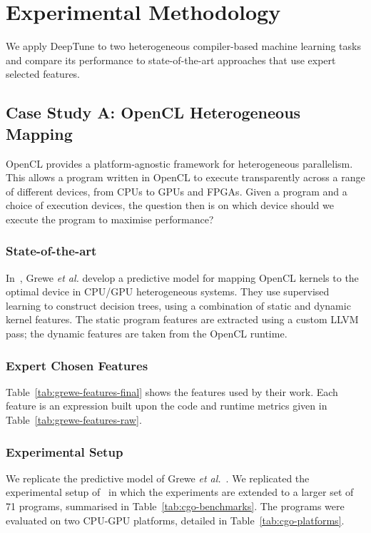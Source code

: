 \section{Experimental Methodology}\label{sec:methodology}

We apply DeepTune to two heterogeneous compiler-based machine learning tasks and compare its performance to state-of-the-art approaches that use expert selected features.


\subsection{Case Study A: OpenCL Heterogeneous Mapping} \label{subsec:case-study-a}



OpenCL provides a platform-agnostic framework for heterogeneous parallelism. This allows a program written in OpenCL to execute transparently across a range of different devices, from CPUs to GPUs and FPGAs. Given a program and a choice of execution devices, the question then is on which device should we execute the program to maximise performance?

\subsubsection{State-of-the-art} In~\cite{Grewe2013}, Grewe \emph{et al.} develop a predictive model for mapping OpenCL kernels to the optimal device in CPU/GPU heterogeneous systems. They use supervised learning to construct decision trees, using a combination of static and dynamic kernel features. The static program features are extracted using a custom LLVM pass; the dynamic features are taken from the OpenCL runtime.

\subsubsection{Expert Chosen Features} Table~\ref{tab:grewe-features-final} shows the features used by their work. Each feature is an expression built upon the code and runtime metrics given in Table~\ref{tab:grewe-features-raw}.

\subsubsection{Experimental Setup} We replicate the predictive model of Grewe \emph{et al.}~\cite{Grewe2013}. We replicated the experimental setup of~\cite{Cummins2017a} in which the experiments are extended to a larger set of 71 programs, summarised in Table~\ref{tab:cgo-benchmarks}. The programs were evaluated on two CPU-GPU platforms, detailed in Table~\ref{tab:cgo-platforms}.

